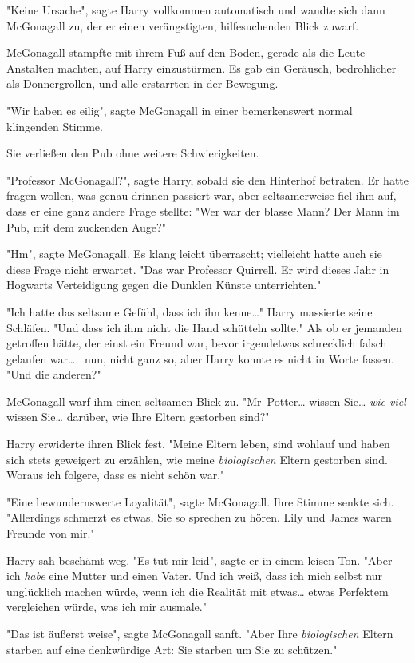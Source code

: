 {"Keine Ursache", sagte Harry vollkommen automatisch und wandte sich dann McGonagall zu, der er einen verängstigten, hilfesuchenden Blick zuwarf.

McGonagall stampfte mit ihrem Fuß auf den Boden, gerade als die Leute Anstalten machten, auf Harry einzustürmen. Es gab ein Geräusch, bedrohlicher als Donnergrollen, und alle erstarrten in der Bewegung.

"Wir haben es eilig", sagte McGonagall in einer bemerkenswert normal klingenden Stimme.

Sie verließen den Pub ohne weitere Schwierigkeiten.

"Professor McGonagall?", sagte Harry, sobald sie den Hinterhof betraten. Er hatte fragen wollen, was genau drinnen passiert war, aber seltsamerweise fiel ihm auf, dass er eine ganz andere Frage stellte: "Wer war der blasse Mann? Der Mann im Pub, mit dem zuckenden Auge?"

"Hm", sagte McGonagall. Es klang leicht überrascht; vielleicht hatte auch sie diese Frage nicht erwartet. "Das war Professor Quirrell. Er wird dieses Jahr in Hogwarts Verteidigung gegen die Dunklen Künste unterrichten."

"Ich hatte das seltsame Gefühl, dass ich ihn kenne…" Harry massierte seine Schläfen. "Und dass ich ihm nicht die Hand schütteln sollte." Als ob er jemanden getroffen hätte, der einst ein Freund war, bevor irgendetwas schrecklich falsch gelaufen war… ~nun, nicht ganz so, aber Harry konnte es nicht in Worte fassen. "Und die anderen?"

McGonagall warf ihm einen seltsamen Blick zu. "Mr~Potter… wissen Sie… \emph{wie viel} wissen Sie… darüber, wie Ihre Eltern gestorben sind?"

Harry erwiderte ihren Blick fest. "Meine Eltern leben, sind wohlauf und haben sich stets geweigert zu erzählen, wie meine \emph{biologischen} Eltern gestorben sind. Woraus ich folgere, dass es nicht schön war."

"Eine bewundernswerte Loyalität", sagte McGonagall. Ihre Stimme senkte sich. "Allerdings schmerzt es etwas, Sie so sprechen zu hören. Lily und James waren Freunde von mir."

Harry sah beschämt weg. "Es tut mir leid", sagte er in einem leisen Ton. "Aber ich \emph{habe} eine Mutter und einen Vater. Und ich weiß, dass ich mich selbst nur unglücklich machen würde, wenn ich die Realität mit etwas… etwas Perfektem vergleichen würde, was ich mir ausmale."

"Das ist äußerst weise", sagte McGonagall sanft. "Aber Ihre \emph{biologischen} Eltern starben auf eine denkwürdige Art: Sie starben um Sie zu schützen."

}
